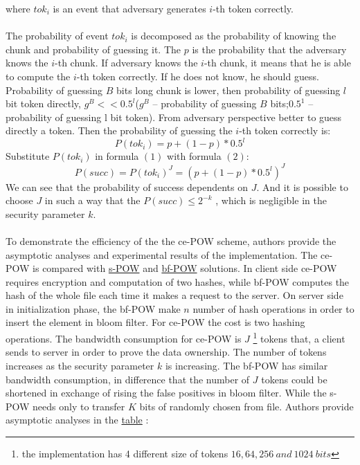 \documentclass[12pt]{article}
\begin{document}
where $tok_i$ is an event that  adversary generates $i$-th token correctly.\\\\
The probability of event $tok_i$ is decomposed as the probability of knowing the chunk and probability of guessing it. The $p$ is the probability that the adversary knows the $i$-th chunk.  If adversary knows the $i$-th chunk, it means that he is able to compute the $i$-th token correctly. If he does not know, he should guess. Probability of guessing $B$ bits long chunk is lower, then probability of guessing $l$ bit token directly, $g^B << 0.5^l$($g^B$ -- probability of guessing $B$ bits;$0.5^1$ -- probability of guessing l bit token). From adversary perspective better to guess directly a token. Then the probability of guessing the $i$-th token correctly is: 
\begin{equation}\label{2}
 P(tok_i)=p+(1-p)*0.5^l
\end{equation}
Substitute $P(tok_i)$ in  formula $(1)$ with  formula $(2)$: 
\begin{equation}\label{3}
P(succ) = P(tok_i)^J = (p+(1-p)*0.5^l)^J
\end{equation}
We can see that the probability of success dependents on $J$. And it is possible to choose $J$ in such a way that the $P(succ) \leq 2^{-k}$ , which is negligible in the security parameter $k$.\\\\
To demonstrate the efficiency of the the ce-POW scheme, authors provide the asymptotic  analyses and experimental results of the implementation. The ce-POW is compared with \hyperref[sub:Soltuion2]{s-POW} and \hyperref[sub:Soltuion6]{bf-POW} solutions. In client side ce-POW requires encryption and computation of two hashes, while bf-POW computes the hash of the whole file each time it makes a request to the server. On server side  in initialization phase, the bf-POW make $n$ number of hash operations in order to insert the element in bloom filter. For ce-POW the  cost is  two hashing operations. The bandwidth consumption for ce-POW is $J$ \footnote{ the implementation has 4 different size of tokens $16, 64, 256\ and\  1024\ bits$} tokens that, a client sends to server in order to prove the data ownership. The number of tokens increases as the security parameter $k$ is increasing. The bf-POW has  similar  bandwidth consumption, in difference that the number of $J$ tokens could be  shortened in exchange of rising the false positives in bloom filter. While the s-POW needs only to transfer $K$ bits of randomly chosen from file. Authors provide asymptotic analyses in the \hyperref[table:asymptoticAnalysisCE-POW]{table}  :
\end{document}

